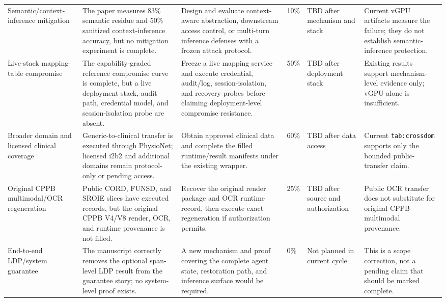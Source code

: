 \documentclass[11pt]{article}
\begin{document}
\begin{longtable}{p{}p{}p{}p{}p{}p{}}
Semantic/context-inference mitigation & The paper measures 83\% semantic residue and 50\% sanitized context-inference accuracy, but no mitigation experiment is complete. & Design and evaluate context-aware abstraction, downstream access control, or multi-turn inference defenses with a frozen attack protocol. & 10\% & TBD after mechanism and stack & Current vGPU artifacts measure the failure; they do not establish semantic-inference protection. \\
Live-stack mapping-table compromise & The capability-graded reference compromise curve is complete, but a live deployment stack, audit path, credential model, and session-isolation probe are absent. & Freeze a live mapping service and execute credential, audit/log, session-isolation, and recovery probes before claiming deployment-level compromise resistance. & 50\% & TBD after deployment stack & Existing results support mechanism-level evidence only; vGPU alone is insufficient. \\
Broader domain and licensed clinical coverage & Generic-to-clinical transfer is executed through PhysioNet; licensed i2b2 and additional domains remain protocol-only or pending access. & Obtain approved clinical data and complete the filled runtime/result manifests under the existing wrapper. & 60\% & TBD after data access & Current \texttt{tab:crossdom} supports only the bounded public-transfer claim. \\
Original CPPB multimodal/OCR regeneration & Public CORD, FUNSD, and SROIE slices have executed records, but the original CPPB V4/V8 render, OCR, and runtime provenance is not filled. & Recover the original render package and OCR runtime record, then execute exact regeneration if authorization permits. & 25\% & TBD after source and authorization & Public OCR transfer does not substitute for original CPPB multimodal provenance. \\
End-to-end LDP/system guarantee & The manuscript correctly removes the optional span-level LDP result from the guarantee story; no system-level proof exists. & A new mechanism and proof covering the complete agent state, restoration path, and inference surface would be required. & 0\% & Not planned in current cycle & This is a scope correction, not a pending claim that should be marked complete. \\
\end{longtable}
\end{document}
